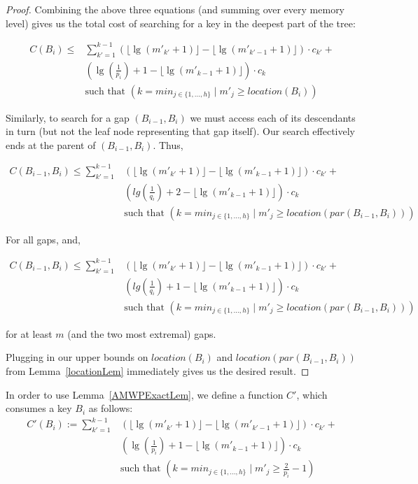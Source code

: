 \documentclass[letterpaper,12pt,titlepage,oneside,final]{book}
\theoremstyle{plain}
\begin{document}
\begin{proof}
Combining the above three equations (and summing over every memory level) gives us the total cost of searching for a key in the deepest part of the tree:

\begin{align*}
C(B_i) \leq &\sum_{k'=1}^{k-1} \left(\lfloor \lg(m'_{k'}+1) \rfloor - \lfloor \lg(m'_{k'-1}+1) \rfloor \right)\cdot c_{k'}+ \\
 &\left(\lg(\frac{1}{p_i}) + 1 - \lfloor \lg(m'_{k-1}+1) \rfloor \right)\cdot c_k \\
&\text{such that } \left( k=min_{j \in \{1, ..., h\}} \mid m'_j \geq location(B_i) \right)
\end{align*}

Similarly, to search for a gap $(B_{i-1},B_i)$ we must access each of its descendants in turn (but not the leaf node representing that gap itself). Our search effectively ends at the parent of $(B_{i-1},B_i)$. Thus, 

\begin{align*}
C(B_{i-1},B_i) \leq \sum_{k'=1}^{k-1} &\left(\lfloor \lg(m'_{k'}+1) \rfloor - \lfloor \lg(m'_{k-1}+1) \rfloor \right)\cdot c_{k'}+ \\
 &\left(lg(\frac{1}{q_i}) + 2 - \lfloor \lg(m'_{k-1}+1) \rfloor \right)\cdot c_k \\
&\text{such that } \left( k=min_{j \in \{1, ..., h\}} \mid m'_j \geq location(par(B_{i-1},B_i)) \right)
\end{align*}

For all gaps, and,  

\begin{align*}
C(B_{i-1},B_i) \leq \sum_{k'=1}^{k-1} &\left(\lfloor \lg(m'_{k'}+1) \rfloor - \lfloor \lg(m'_{k-1}+1) \rfloor \right)\cdot c_{k'}+ \\
&\left(lg(\frac{1}{q_i}) + 1 - \lfloor \lg(m'_{k-1}+1) \rfloor \right)\cdot c_k \\
&\text{such that } \left( k=min_{j \in \{1, ..., h\}} \mid m'_j \geq location(par(B_{i-1},B_i)) \right)
\end{align*}

for at least $m$ (and the two most extremal) gaps.

Plugging in our upper bounds on $location(B_i)$ and $location(par(B_{i-1},B_i))$ from Lemma~\ref{locationLem} immediately gives us the desired result.

\end{proof}

In order to use Lemma~\ref{AMWPExactLem}, we define a function $C'$, which consumes a key $B_i$ as follows:
\begin{align*}
C'(B_i) :=  \sum_{k'=1}^{k-1} &\left(\lfloor \lg(m'_{k'}+1) \rfloor - \lfloor \lg(m'_{k'-1}+1) \rfloor \right)\cdot c_{k'}+ \\
 &\left(\lg(\frac{1}{p_i}) + 1 - \lfloor \lg(m'_{k-1}+1) \rfloor \right)\cdot c_k\\
&\text{such that } \left( k=min_{j \in \{1, ..., h\}} \mid m'_j \geq \frac{2}{p_i}-1 \right) 
\end{align*}
\end{document}
